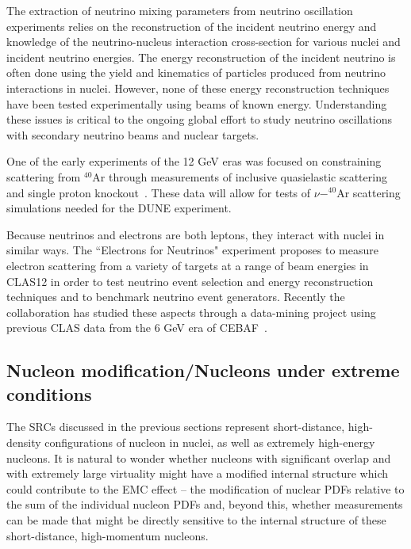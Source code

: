 The extraction of neutrino mixing parameters from neutrino oscillation experiments relies on the reconstruction of the incident neutrino energy and knowledge of the neutrino-nucleus interaction cross-section for various nuclei and incident neutrino energies. The energy reconstruction of the incident neutrino is often done using the yield and kinematics of particles produced from neutrino interactions in nuclei. However, none of these energy reconstruction techniques have been tested experimentally using beams of known energy. Understanding these issues is critical to the ongoing global effort to study neutrino oscillations with secondary neutrino beams and nuclear targets.

One of the early experiments of the 12 GeV eras was focused on constraining scattering from $^{40}$Ar through measurements of inclusive quasielastic scattering and single proton knockout~\cite{Dai:2018gch,JeffersonLabHallA:2020rcp}. These data will allow for tests of $\nu-^{40}$Ar scattering simulations needed for the DUNE experiment.

Because neutrinos and electrons are both leptons, they interact with nuclei in
similar ways. The ``Electrons for Neutrinos" experiment proposes to measure electron scattering from a variety of targets at a range of beam energies in CLAS12 in order to test neutrino event selection and energy reconstruction techniques and to benchmark neutrino event generators. Recently the collaboration has studied these aspects through a data-mining project using previous CLAS data from the 6 GeV era of CEBAF~\cite{e4nu}.



\subsection{Nucleon modification/Nucleons under extreme conditions}\label{sec:4:emc}

The SRCs discussed in the previous sections represent short-distance, high-density configurations of nucleon in nuclei, as well as extremely high-energy nucleons.  It is natural to wonder whether nucleons with significant overlap and with extremely large virtuality might have a modified internal structure which could contribute to the EMC effect -- the modification of nuclear PDFs relative to the sum of the individual nucleon PDFs and, beyond this, whether measurements can be made that might be directly sensitive to the internal structure of these short-distance, high-momentum nucleons. 


